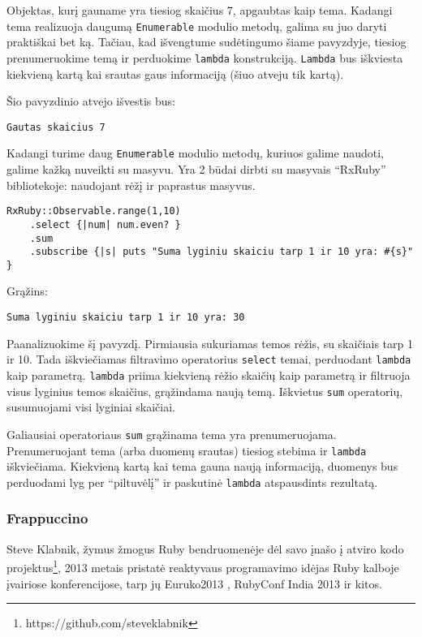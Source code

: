 Objektas, kurį gauname yra tiesiog skaičius 7, apgaubtas kaip tema. Kadangi tema realizuoja daugumą \lstinline|Enumerable| modulio metodų, galima su juo daryti praktiškai bet ką. Tačiau, kad išvengtume sudėtingumo šiame pavyzdyje, tiesiog prenumeruokime temą ir perduokime \lstinline|lambda| konstrukciją. \lstinline|Lambda| bus iškviesta kiekvieną kartą kai srautas gaus informaciją (šiuo atveju tik kartą).

Šio pavyzdinio atvejo išvestis bus:

\begin{lstlisting}[]
  Gautas skaicius 7
\end{lstlisting}

Kadangi turime daug \lstinline|Enumerable| modulio metodų, kuriuos galime naudoti, galime kažką nuveikti su masyvu. Yra 2 būdai dirbti su masyvais ``RxRuby'' bibliotekoje: naudojant rėžį ir paprastus masyvus.

\begin{lstlisting}[]
  RxRuby::Observable.range(1,10)
    .select {|num| num.even? }
    .sum
    .subscribe {|s| puts "Suma lyginiu skaiciu tarp 1 ir 10 yra: #{s}" }
\end{lstlisting}

Grąžins:

\begin{lstlisting}[]
  Suma lyginiu skaiciu tarp 1 ir 10 yra: 30
\end{lstlisting}

Paanalizuokime šį pavyzdį. Pirmiausia sukuriamas temos rėžis, su skaičiais tarp 1 ir 10. Tada iškviečiamas filtravimo operatorius \lstinline|select| temai, perduodant \lstinline|lambda| kaip parametrą. \lstinline|lambda| priima kiekvieną rėžio skaičių kaip parametrą ir filtruoja visus lyginius temos skaičius, grąžindama naują temą. Iškvietus \lstinline|sum| operatorių, susumuojami visi lyginiai skaičiai.

Galiausiai operatoriaus \lstinline|sum| grąžinama tema yra prenumeruojama. Prenumeruojant tema (arba duomenų srautas) tiesiog stebima ir \lstinline|lambda| iškviečiama. Kiekvieną kartą kai tema gauna naują informaciją, duomenys bus perduodami lyg per ``piltuvėlį'' ir paskutinė \lstinline|lambda| atspausdints rezultatą.

\subsubsection{Frappuccino}

Steve Klabnik, žymus žmogus Ruby bendruomenėje dėl savo įnašo į atviro kodo projektus\footnote{https://github.com/steveklabnik}, 2013 metais pristatė reaktyvaus programavimo idėjas Ruby kalboje įvairiose konferencijose, tarp jų Euruko2013 \cite{klabnik:euruko}, RubyConf India 2013 \cite{klabnik:india} ir kitos.

